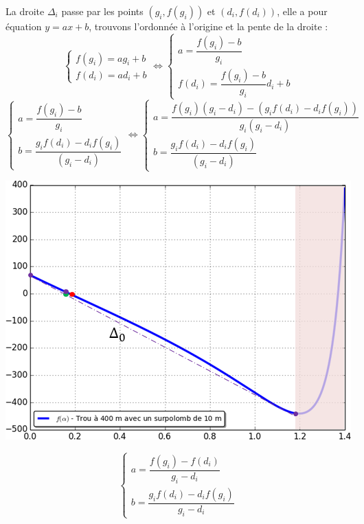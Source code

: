 \documentclass[10pt]{article}
\newif\ifprof
\begin{document}
\ifprof
\begin{minipage}[c]{.49\linewidth}
La droite $\Delta_i$ passe par les points $(g_i,f(g_i))$ et $(d_i,f(d_i))$, elle a pour équation $y=ax + b$, trouvons l'ordonnée à l'origine et la pente de la droite :
$$
\left\{
\begin{array}{l}
f(g_i) = a g_i + b \\
f(d_i) = a d_i + b 
\end{array}
\right.
\Longleftrightarrow
\left\{
\begin{array}{l}
a = \dfrac{f(g_i)-b}{g_i} \\
f(d_i) =  \dfrac{f(g_i)-b}{g_i}d_i + b 
\end{array}
\right.
$$ 
$$
\left\{
\begin{array}{l}
a = \dfrac{f(g_i)-b}{g_i} \\
b = \dfrac{g_i f(d_i) -d_if(g_i) }{(g_i  -d_i)}
\end{array}
\right.
\Longleftrightarrow
\left\{
\begin{array}{l}
a = \dfrac{f(g_i)(g_i  -d_i)- (g_i f(d_i) -d_if(g_i) )}{g_i(g_i-d_i)} \\
b = \dfrac{g_i f(d_i) -d_if(g_i) }{(g_i  -d_i)}
\end{array}
\right.
$$ 
\end{minipage} \hfill
\begin{minipage}[c]{.43\linewidth}
\begin{center}
\includegraphics[width=.9\textwidth]{images/InterpretationG2}
\end{center}
\end{minipage}
\vspace{.25cm}

$$
\left\{
\begin{array}{l}
a = \dfrac{f(g_i)  -  f(d_i)  }{g_i-d_i} \\
b = \dfrac{g_i f(d_i) -d_if(g_i) }{g_i  -d_i}
\end{array}
\right.
$$ 
\end{document}
